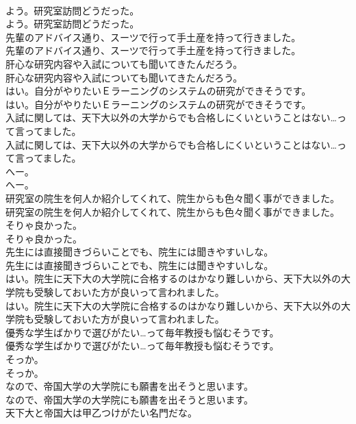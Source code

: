 \documentclass[8pt]{extreport}
\begin{document}
\begin{CJK}{UTF8}{min}
\\	よう。研究室訪問どうだった。	
\\	よう。研究室訪問どうだった。 
\\	先輩のアドバイス通り、スーツで行って手土産を持って行きました。	
\\	先輩のアドバイス通り、スーツで行って手土産を持って行きました。 
\\	肝心な研究内容や入試についても聞いてきたんだろう。	
\\	肝心な研究内容や入試についても聞いてきたんだろう。 
\\	はい。自分がやりたいＥラーニングのシステムの研究ができそうです。	
\\	はい。自分がやりたいＥラーニングのシステムの研究ができそうです。 
\\	入試に関しては、天下大以外の大学からでも合格しにくいということはない…って言ってました。	
\\	入試に関しては、天下大以外の大学からでも合格しにくいということはない…って言ってました。 
\\	へー。	
\\	へー。 
\\	研究室の院生を何人か紹介してくれて、院生からも色々聞く事ができました。	
\\	研究室の院生を何人か紹介してくれて、院生からも色々聞く事ができました。 
\\	そりゃ良かった。	
\\	そりゃ良かった。 
\\	先生には直接聞きづらいことでも、院生には聞きやすいしな。	
\\	先生には直接聞きづらいことでも、院生には聞きやすいしな。 
\\	はい。院生に天下大の大学院に合格するのはかなり難しいから、天下大以外の大学院も受験しておいた方が良いって言われました。	
\\	はい。院生に天下大の大学院に合格するのはかなり難しいから、天下大以外の大学院も受験しておいた方が良いって言われました。 
\\	優秀な学生ばかりで選びがたい…って毎年教授も悩むそうです。	
\\	優秀な学生ばかりで選びがたい…って毎年教授も悩むそうです。 
\\	そっか。	
\\	そっか。 
\\	なので、帝国大学の大学院にも願書を出そうと思います。	
\\	なので、帝国大学の大学院にも願書を出そうと思います。 
\\	天下大と帝国大は甲乙つけがたい名門だな。	

\end{CJK}
\end{document}
